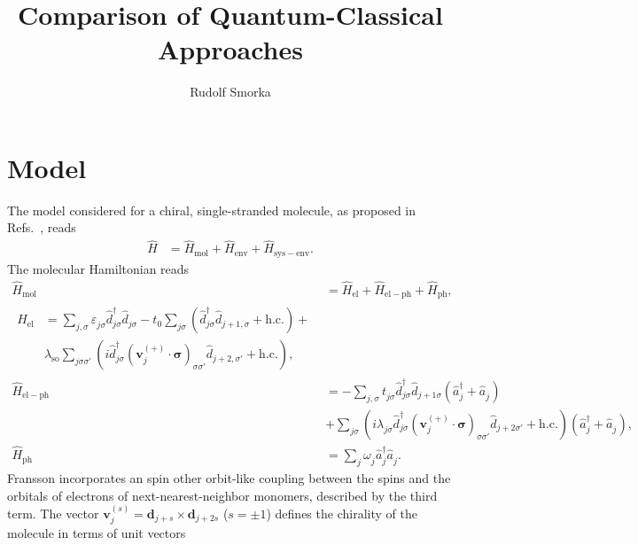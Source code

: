 \documentclass{article}
\renewcommand{\vec}[1]{\mathbf{#1}}
\newcommand{\pdagger}{{\phantom{\dagger}}}
\begin{document}
\title{Comparison of Quantum-Classical Approaches}
\author{Rudolf Smorka}
\maketitle
\section{Model}
The model considered for a chiral, single-stranded molecule, as proposed in Refs.~\cite{fransson2019chirality,fransson2020vibrational,Fransson_2021,fransson2021charge}, reads
\begin{align}
	\hat{H} &= \hat{H}_\mathrm{mol} + \hat{H}_\mathrm{env} + \hat{H}_\mathrm{sys-env}.
\end{align} 
The molecular Hamiltonian reads
\begin{align}
	\hat{H}_\mathrm{mol} &= \hat{H}_\mathrm{el} + \hat{H}_\mathrm{el-ph} + \hat{H}_\mathrm{ph},\\
	\begin{split}
		\hat{H}_\mathrm{el} &= \sum_{j,\sigma} \varepsilon_{j\sigma}^\pdagger \hat{d}_{j\sigma}^\dagger \hat{d}_{j\sigma}^\pdagger - t_0 \sum_{j\sigma} (\hat{d}_{j\sigma}^\dagger \hat{d}_{j+1,\sigma}^\pdagger + \mathrm{h.c.}) +\\& \lambda_\mathrm{so}^\pdagger\sum_{j\sigma\sigma'} (i\hat{d}_{j\sigma}^\dagger (\vec{v}_j^{(+)}\cdot \bm{\sigma})_{\sigma\sigma'}^\pdagger \hat{d}_{j+2,\sigma'}^\pdagger + \mathrm{h.c.}),
	\end{split}\\
	\hat{H}_\mathrm{el-ph} &= - \sum_{j,\sigma} t_{j\sigma}^\pdagger \hat{d}_{j\sigma}^\dagger \hat{d}_{j+1\sigma}^\pdagger (\hat{a}_{j}^\dagger + \hat{a}_{j}^\pdagger) \\ & + \sum_{j\sigma} (i\lambda_{j\sigma}^\pdagger \hat{d}_{j\sigma}^\dagger (\vec{v}_j^{(+)} \cdot \bm{\sigma})_{\sigma\sigma'}^\pdagger \hat{d}_{j+2\sigma'}^\pdagger +\mathrm{h.c.})(\hat{a}_{j}^\dagger + \hat{a}_{j}^\pdagger),\label{eq:HelPh}\\
	\hat{H}_\mathrm{ph} &= \sum_{j} \omega_{j}^\pdagger \hat{a}_{j}^\dagger \hat{a}_{j}^\pdagger.
	 \label{eq:Hamiltonian_el_Fransson} 
\end{align}
Fransson incorporates an spin other orbit-like coupling \cite{zoellner2020influence} between the spins and the orbitals of electrons of next-nearest-neighbor monomers, described by the third term.  
The vector $\vec{v}_j^{(s)} = \vec{d}_{j+s}\times \vec{d}_{j+2s}$ ($s=\pm 1$) defines the chirality of the molecule in terms of unit vectors 
\end{document}
